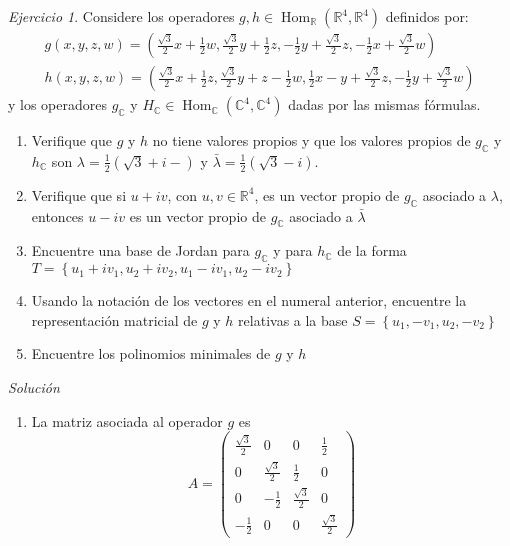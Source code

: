 \documentclass[11pt,a4paper]{article}
\theoremstyle{definition}
\theoremstyle{remark}
\newtheorem{exc}{Ejercicio}
\newcommand{\set}[1]{\left\lbrace #1 \right\rbrace}
\newcommand{\RR}{\mathbb{R}}
\newcommand{\Hom}{\operatorname{Hom}}
\newcommand{\CC}{\mathbb{C}}
\begin{document}
\begin{exc}
	Considere los operadores $ g,h \in \Hom_\RR (\RR^4, \RR^4) $ definidos por:
	\begin{align*}
	g(x,y,z,w) = \left( \frac{\sqrt{3}}{2}x + \frac{1}{2}w, \frac{\sqrt{3}}{2}y + \frac{1}{2}z, -\frac{1}{2}y + \frac{\sqrt{3}}{2}z, - \frac{1}{2}x + \frac{\sqrt{3}}{2} w \right) \\
	h(x,y,z,w) = \left( \frac{\sqrt{3}}{2}x + \frac{1}{2}z, \frac{\sqrt{3}}{2}y +z - \frac{1}{2}w, \frac{1}{2}x-y+ \frac{\sqrt{3}}{2}z, - \frac{1}{2}y + \frac{\sqrt{3}}{2}w \right)	\end{align*}
	y los operadores $ g_\CC $ y $  H_\CC \in \Hom_\CC ( \CC^4, \CC^4) $ dadas por las mismas fórmulas.
	\begin{enumerate}
		\item Verifique que $ g $ y $ h $ no tiene valores propios y que los valores propios de $ g_\CC $ y $ h_\CC $ son $ \lambda = \frac{1}{2}(\sqrt{3} + i-) $ y $ \bar{\lambda} = \frac{1}{2}(\sqrt{3} - i) $.
		\item Verifique que si $ u + iv $, con $ u,v \in \RR^4 $, es un vector propio de $ g_\CC $ asociado a $ \lambda $, entonces $ u - iv $ es un vector propio de $ g_\CC $ asociado a $ \bar{\lambda} $
		\item Encuentre una base de Jordan para $ g_\CC $ y para $ h_\CC $ de la forma $ T = \set{u_1 + i v_1, u_2 + i v_2, u_1 - i v_1, u_2 - iv_2 } $
		\item Usando la notación de los vectores en el numeral anterior, encuentre la representación matricial de $ g $ y $ h $ relativas a la base $ S = \set{u_1, - v_1, u_2, -v_2} $ 
		\item Encuentre los polinomios minimales de $ g $ y $ h $
	\end{enumerate}
	\textit{Solución}
	
		\begin{enumerate}
		\item La matriz asociada al operador $ g $ es 
		\begin{equation}
		A= \begin{pmatrix}
		\frac{\sqrt{3}}{2} & 0 & 0 & \frac{1}{2}
		\\ 0 & \frac{\sqrt{3}}{2} & \frac{1}{2} & 0 
		\\ 0 & -\frac{1}{2} & \frac{\sqrt{3}}{2} & 0
		\\ -\frac{1}{2} & 0 & 0 & \frac{\sqrt{3}}{2}
		\end{pmatrix} \nonumber
		\end{equation}
		

\end{enumerate}
\end{exc}
\end{document}
